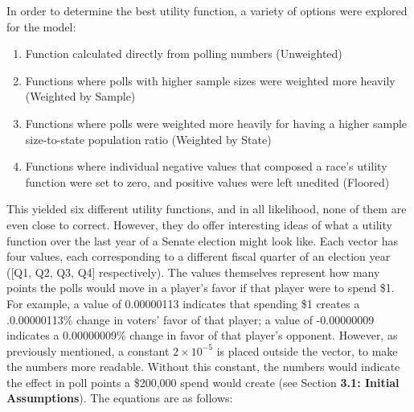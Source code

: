 \documentclass[11pt]{article}
\begin{document}
In order to determine the best utility function, a variety of options were
explored for the model:
\begin{enumerate}
\item Function calculated directly from polling numbers (Unweighted)
\item Functions where polls with higher sample sizes were weighted more heavily
(Weighted by Sample)
\item Functions where polls were weighted more heavily for having a higher
sample size-to-state population ratio (Weighted by State)
\item Functions where individual negative values that composed a race's utility
function were set to zero, and positive values were left unedited (Floored)
\end{enumerate}
This yielded six different utility functions, and in all likelihood, none of
them are even close to correct. However, they do offer interesting ideas of what a utility
function over the last year of a Senate election might look like. Each vector
has four values, each corresponding to a different fiscal quarter of an
election year ([Q1, Q2, Q3, Q4] respectively). The values themselves represent
how many points the polls would move in a player's favor if that player were to
spend \$1. For example, a value of 0.00000113 indicates that spending
\$1 creates a .0.00000113\% change in voters' favor of that player; a value of
-0.00000009 indicates a 0.00000009\% change in favor of that player's opponent. However, as previously mentioned, a constant $2 \times 10^{-5}$ is placed outside the vector, to make the numbers more readable. Without this constant, the numbers would indicate the effect in poll points a \$200,000 spend would create (see Section \textbf{3.1: Initial Assumptions}). The equations are as follows:\\
\end{document}
